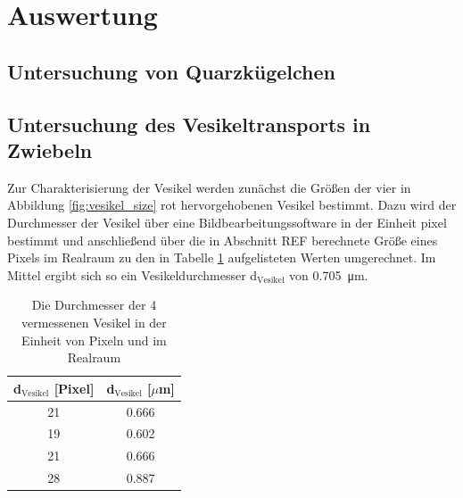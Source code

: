 \newpage
\section{Auswertung}

    \subsection{Untersuchung von Quarzkügelchen}




    \subsection{Untersuchung des Vesikeltransports in Zwiebeln}
        \FloatBarrier
        Zur Charakterisierung der Vesikel werden zunächst die Größen der vier in Abbildung \ref{fig:vesikel_size} rot hervorgehobenen Vesikel bestimmt. Dazu wird der Durchmesser der Vesikel über eine 
        Bildbearbeitungssoftware in der Einheit pixel bestimmt und anschließend über die in Abschnitt REF berechnete Größe eines Pixels im Realraum zu den in Tabelle \ref{tab:d_vesikel} aufgelisteten Werten 
        umgerechnet. Im Mittel ergibt sich so ein Vesikeldurchmesser d$_\text{Vesikel}$ von \SI{0.705}{\micro\metre}.
        \begin{table}[h]
            \centering
            \caption{Die Durchmesser der 4 vermessenen Vesikel in der Einheit von Pixeln und im Realraum}
            \label{tab:d_vesikel}
            \begin{tabular}{c c}
            \toprule
            {d$_\text{Vesikel}$ [Pixel]} & {d$_\text{Vesikel}$ [$\mu$m]}  \\
            \midrule
            21	 &  0.666  \\
            19	 &  0.602  \\
            21	 &  0.666  \\
            28	 &  0.887  \\
            \bottomrule
            \end{tabular}
        \end{table}
